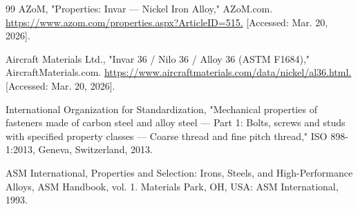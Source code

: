 \documentclass[12pt, letterpaper]{report}%
\begin{document}
\begin{thebibliography}{99}
     AZoM, "Properties: Invar — Nickel Iron Alloy," AZoM.com. \url{https://www.azom.com/properties.aspx?ArticleID=515.}
    [Accessed: Mar. 20, 2026].

    Aircraft Materials Ltd., "Invar 36 / Nilo 36 / Alloy 36 (ASTM F1684)," AircraftMaterials.com. \url{https://www.aircraftmaterials.com/data/nickel/al36.html. }
    [Accessed: Mar. 20, 2026].

    International Organization for Standardization, "Mechanical properties of fasteners made of carbon steel and alloy steel — 
    Part 1: Bolts, screws and studs with specified property classes — Coarse thread and fine pitch thread," ISO 898-1:2013, Geneva, Switzerland, 2013.

    ASM International, Properties and Selection: Irons, Steels, and High-Performance Alloys, ASM Handbook, vol. 1. Materials Park, OH, USA: ASM International, 1993.
    

    




\end{thebibliography}


%
\end{document}
